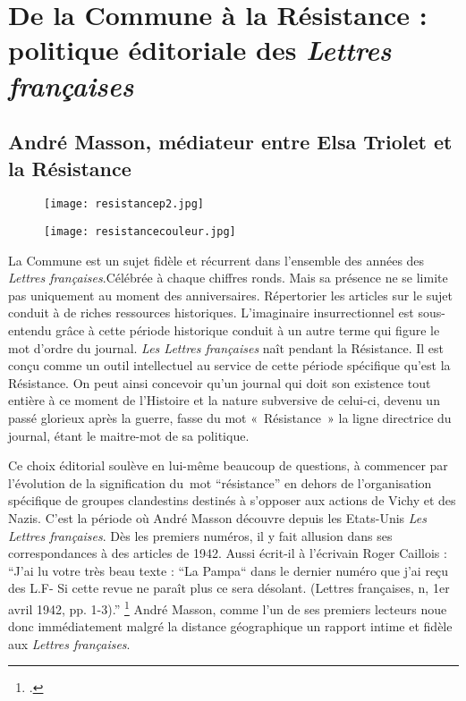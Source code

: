 \section{De la Commune à la Résistance : politique éditoriale des \emph{Lettres françaises}}

\subsection{André Masson, médiateur entre Elsa Triolet et la Résistance}

\begin{figure}[H]
   \centering
   \texttt{[image: resistancep2.jpg]}
	\caption{\cite{specialelsa}}\label{fig:Réssitance}
\end{figure}

\begin{figure}[H]
   \centering
   \texttt{[image: resistancecouleur.jpg]}
	\caption{\cite{specialelsa}}\label{fig:Réssitancecouleur}
\end{figure}


La Commune est un sujet fidèle et récurrent dans l’ensemble des années des \emph{Lettres françaises}.Célébrée à chaque chiffres ronds. Mais sa présence ne se limite pas uniquement au moment des anniversaires. Répertorier les articles sur le sujet conduit à de riches ressources historiques. L’imaginaire insurrectionnel est sous-entendu grâce à cette période historique conduit à un autre terme qui figure le mot d’ordre du journal. \emph{Les Lettres françaises} naît pendant la Résistance. Il est conçu comme un outil intellectuel au service de cette période spécifique qu’est la Résistance. On peut ainsi concevoir qu’un journal qui doit son existence tout entière à ce moment de l’Histoire et la nature subversive de celui-ci, devenu un passé glorieux après la guerre, fasse du mot « Résistance » la ligne directrice du journal, étant le maitre-mot de sa politique. 


	Ce choix éditorial soulève en lui-même beaucoup de questions, à commencer par l’évolution de la signification du mot \enquote{résistance} en dehors de l’organisation spécifique de groupes clandestins destinés à s’opposer aux actions de Vichy et des Nazis. C’est la période où André Masson découvre depuis les Etats-Unis \emph{Les Lettres françaises}. Dès les premiers numéros, il y  fait allusion dans ses correspondances à des articles de 1942. Aussi écrit-il à l’écrivain Roger Caillois : \enquote{J’ai lu votre très beau texte : “La Pampa“ dans le dernier numéro que j’ai reçu des L.F- Si cette revue ne paraît plus ce sera désolant. (Lettres françaises, n, 1er avril 1942, pp. 1-3).} \footcite[p482]{anneessurrealistes} André Masson, comme l’un de ses premiers lecteurs noue donc immédiatement malgré la distance géographique un rapport intime et fidèle aux \emph{Lettres françaises}. 


